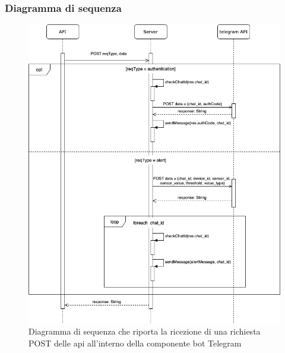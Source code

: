 \subsubsection{Diagramma di sequenza}%
	\begin{figure}[H]
		\centering
		\includegraphics[scale=0.600]{res/images/BOTTELEGRAM/TelegramRichiestaPOST.png}
		\caption{Diagramma di sequenza che riporta la ricezione di una richiesta POST delle api all'interno della componente bot Telegram}
		\label{Diagramma 20}
	\end{figure}